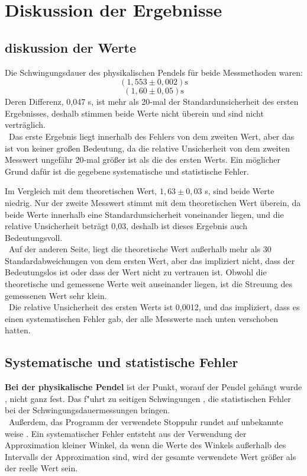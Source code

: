 \documentclass[11pt,a4paper]{article} %
\begin{document}
\section{Diskussion der Ergebnisse}
\subsection{diskussion der Werte}
Die Schwingungsdauer des physikalischen Pendels für beide Messmethoden waren:
$$(1,553 \pm 0,002) \textrm{s}$$
$$(1,60 \pm 0,05) \textrm{s}$$
Deren Differenz, 0,047 s, ist mehr als 20-mal der Standardunsicherheit des ersten Ergebnisses, deshalb stimmen beide Werte nicht überein und sind nicht verträglich. 
\\\
Das erste Ergebnis liegt innerhalb des Fehlers von dem zweiten Wert, aber das ist von keiner großen Bedeutung, da die relative Unsicherheit von dem zweiten Messwert ungefähr 20-mal größer ist als die des ersten Werts. Ein möglicher Grund dafür ist die gegebene systematische und statistische Fehler. 

Im Vergleich mit dem theoretischen Wert, $1,63 \pm 0,03$ s, sind beide Werte niedrig. Nur der zweite Messwert stimmt mit dem theoretischen Wert überein, da beide Werte innerhalb eine Standardunsicherheit voneinander liegen, und die relative Unsicherheit beträgt 0,03, deshalb ist dieses Ergebnis auch Bedeutungsvoll. 
\\\
Auf der anderen Seite, liegt die theoretische Wert außerhalb mehr als 30 Standardabweichungen von dem ersten Wert, aber das impliziert nicht, dass der Bedeutungslos ist oder dass der Wert nicht zu vertrauen ist. Obwohl die theoretische und gemessene Werte weit auseinander liegen, ist die Streuung des gemessenen Wert sehr klein. 
\\\
Die relative Unsicherheit des ersten Werts ist 0,0012, und das impliziert, dass es einen systematischen Fehler gab, der alle Messwerte nach unten verschoben hatten. 

\subsection{Systematische und statistische Fehler}
\textbf{Bei der physikalische Pendel} ist der Punkt, worauf der Pendel gehängt wurde , nicht ganz fest. Das f"uhrt zu seitigen Schwingungen , die  statistischen Fehler bei der Schwingungsdauermessungen bringen.
\\\
Außerdem, das Programm der verwendete Stoppuhr rundet auf unbekannte weise  .
Ein systematischer Fehler entsteht aus der Verwendung der Approximation kleiner Winkel, da wenn die Werte des Winkels außerhalb des Intervalls der Approximation sind, wird der gesamte verwendete Wert größer als der reelle Wert sein.
\end{document}
